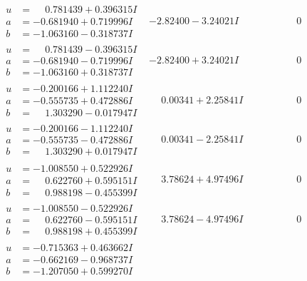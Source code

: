 \documentclass[1p]{elsarticle_modified}
\theoremstyle{definition}
\begin{document}
$$\begin{array}{c|c|c}
\begin{aligned}
u &= \phantom{-}0.781439 + 0.396315 I \\
a &= -0.681940 + 0.719996 I \\
b &= -1.063160 - 0.318737 I\end{aligned}
 & -2.82400 - 3.24021 I & \phantom{-0.000000 } 0 \\ \hline\begin{aligned}
u &= \phantom{-}0.781439 - 0.396315 I \\
a &= -0.681940 - 0.719996 I \\
b &= -1.063160 + 0.318737 I\end{aligned}
 & -2.82400 + 3.24021 I & \phantom{-0.000000 } 0 \\ \hline\begin{aligned}
u &= -0.200166 + 1.112240 I \\
a &= -0.555735 + 0.472886 I \\
b &= \phantom{-}1.303290 - 0.017947 I\end{aligned}
 & \phantom{-}0.00341 + 2.25841 I & \phantom{-0.000000 } 0 \\ \hline\begin{aligned}
u &= -0.200166 - 1.112240 I \\
a &= -0.555735 - 0.472886 I \\
b &= \phantom{-}1.303290 + 0.017947 I\end{aligned}
 & \phantom{-}0.00341 - 2.25841 I & \phantom{-0.000000 } 0 \\ \hline\begin{aligned}
u &= -1.008550 + 0.522926 I \\
a &= \phantom{-}0.622760 + 0.595151 I \\
b &= \phantom{-}0.988198 - 0.455399 I\end{aligned}
 & \phantom{-}3.78624 + 4.97496 I & \phantom{-0.000000 } 0 \\ \hline\begin{aligned}
u &= -1.008550 - 0.522926 I \\
a &= \phantom{-}0.622760 - 0.595151 I \\
b &= \phantom{-}0.988198 + 0.455399 I\end{aligned}
 & \phantom{-}3.78624 - 4.97496 I & \phantom{-0.000000 } 0 \\ \hline\begin{aligned}
u &= -0.715363 + 0.463662 I \\
a &= -0.662169 - 0.968737 I \\
b &= -1.207050 + 0.599270 I\end{aligned}

\end{array}$$
\end{document}
